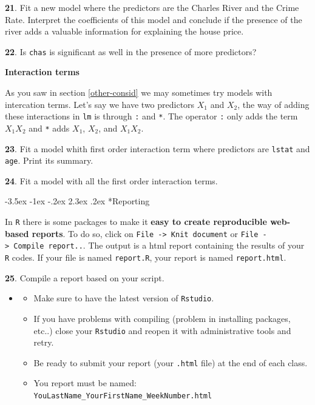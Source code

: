 \documentclass[]{book}
\makeatletter
\providecommand{\tightlist}{%
  \setlength{\itemsep}{0pt}\setlength{\parskip}{0pt}}
\newenvironment{rmdblock}[1]
  {\begin{shaded*}
  \begin{itemize}
  \renewcommand{\labelitemi}{
    \raisebox{-.7\height}[0pt][0pt]{
      {\setkeys{Gin}{width=2em,keepaspectratio}\texttt{[image: img/icons/\#1]}}
    }
  }
  \item
  }
  {
  \end{itemize}
  \end{shaded*}
  }
\newenvironment{rmdcaution}
  {\begin{rmdblock}{caution}}
  {\end{rmdblock}}
\renewcommand\section{\@startsection {section}{1}{\z@}%
                                   {-3.5ex \@plus -1ex \@minus -.2ex}%
                                   {2.3ex \@plus.2ex}%
                                   {\normalfont\Large\bfseries\color{ForestGreen}}}
\theoremstyle{definition}
\theoremstyle{definition}
\theoremstyle{definition}
\theoremstyle{remark}
\makeatother
\begin{document}
\textbf{21}. Fit a new model where the predictors are the Charles River
and the Crime Rate. Interpret the coefficients of this model and
conclude if the presence of the river adds a valuable information for
explaining the house price.

\textbf{22}. Is \texttt{chas} is significant as well in the presence of
more predictors?

\textbf{Interaction terms}

As you saw in section \ref{other-consid} we may sometimes try models
with intercation terms. Let's say we have two predictors \(X_1\) and
\(X_2\), the way of adding these interactions in \texttt{lm} is through
\texttt{:} and \texttt{*}. The operator \texttt{:} only adds the term
\(X_1X_2\) and \texttt{*} adds \(X_1\), \(X_2\), and \(X_1X_2\).

\textbf{23}. Fit a model whith first order interaction term where
predictors are \texttt{lstat} and \texttt{age}. Print its summary.

\textbf{24}. Fit a model with all the first order interaction terms.

\section*{Reporting}\label{reporting}

In \texttt{R} there is some packages to make it \textbf{easy to create
reproducible web-based reports}. To do so, click on
\texttt{File\ -\textgreater{}\ Knit\ document} or
\texttt{File\ -\textgreater{}\ Compile\ report..}. The output is a html
report containing the results of your \texttt{R} codes. If your file is
named \texttt{report.R}, your report is named \texttt{report.html}.

\textbf{25}. Compile a report based on your script.

\begin{rmdcaution}
\begin{itemize}
\tightlist
\item
  Make sure to have the latest version of \texttt{Rstudio}.
\item
  If you have problems with compiling (problem in installing packages,
  etc..) close your \texttt{Rstudio} and reopen it with administrative
  tools and retry.
\item
  Be ready to submit your report (your \texttt{.html} file) at the end
  of each class.
\item
  You report must be named:
  \texttt{YouLastName\_YourFirstName\_WeekNumber.html}
\end{itemize}
\end{rmdcaution}
\end{document}
